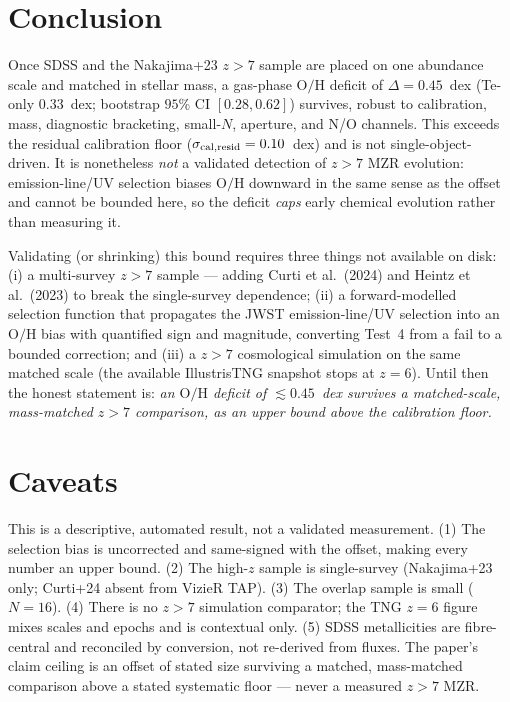\documentclass[twocolumn]{aastex631}
\begin{document}
\section{Conclusion}
Once SDSS and the Nakajima+23 $z>7$ sample are placed on one abundance scale and matched in stellar mass, a gas-phase $\mathrm{O/H}$ deficit of $\Delta=0.45$~dex (Te-only $0.33$~dex; bootstrap $95\%$ CI $[0.28,0.62]$) survives, robust to calibration, mass, diagnostic bracketing, small-$N$, aperture, and N/O channels. This exceeds the residual calibration floor ($\sigma_{\rm cal,resid}=0.10$~dex) and is not single-object-driven. It is nonetheless \emph{not} a validated detection of $z>7$ MZR evolution: emission-line/UV selection biases $\mathrm{O/H}$ downward in the same sense as the offset and cannot be bounded here, so the deficit \emph{caps} early chemical evolution rather than measuring it.

Validating (or shrinking) this bound requires three things not available on disk: (i) a multi-survey $z>7$ sample --- adding Curti et al.\ (2024) and Heintz et al.\ (2023) to break the single-survey dependence; (ii) a forward-modelled selection function that propagates the JWST emission-line/UV selection into an $\mathrm{O/H}$ bias with quantified sign and magnitude, converting Test~4 from a fail to a bounded correction; and (iii) a $z>7$ cosmological simulation on the same matched scale (the available IllustrisTNG snapshot stops at $z=6$). Until then the honest statement is: \emph{an $\mathrm{O/H}$ deficit of $\lesssim0.45$~dex survives a matched-scale, mass-matched $z>7$ comparison, as an upper bound above the calibration floor.}

\section{Caveats}
This is a descriptive, automated result, not a validated measurement. (1) The selection bias is uncorrected and same-signed with the offset, making every number an upper bound. (2) The high-$z$ sample is single-survey (Nakajima+23 only; Curti+24 absent from VizieR TAP). (3) The overlap sample is small ($N=16$). (4) There is no $z>7$ simulation comparator; the TNG $z=6$ figure mixes scales and epochs and is contextual only. (5) SDSS metallicities are fibre-central and reconciled by conversion, not re-derived from fluxes. The paper's claim ceiling is an offset of stated size surviving a matched, mass-matched comparison above a stated systematic floor --- never a measured $z>7$ MZR.
\end{document}
